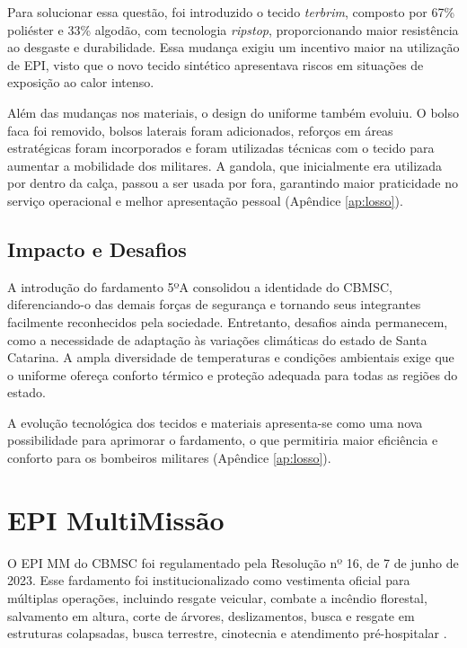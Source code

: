 Para solucionar essa questão, foi introduzido o tecido \textit{terbrim}, composto por 67\% poliéster
 e 33\% algodão, com tecnologia \textit{ripstop}, proporcionando maior resistência ao desgaste 
 e durabilidade. Essa mudança exigiu um incentivo maior na utilização de 
 \acrfull{EPI}, visto que o novo tecido sintético apresentava riscos em situações de exposição 
 ao calor intenso.

Além das mudanças nos materiais, o design do uniforme também evoluiu. O bolso faca foi removido, 
bolsos laterais foram adicionados, reforços em áreas estratégicas foram incorporados e foram utilizadas
técnicas com o tecido para aumentar a mobilidade dos militares. A gandola, que inicialmente 
era utilizada por dentro da calça, passou a ser usada por fora, garantindo maior praticidade no 
serviço operacional e melhor apresentação pessoal (Apêndice \ref{ap:losso}).

\subsection{Impacto e Desafios}

A introdução do fardamento 5ºA consolidou a identidade do \acrshort{CBMSC}, diferenciando-o das 
demais forças de segurança e tornando seus integrantes facilmente reconhecidos pela sociedade. 
Entretanto, desafios ainda permanecem, como a necessidade de adaptação às variações climáticas 
do estado de Santa Catarina. A ampla diversidade de temperaturas e condições ambientais exige 
que o uniforme ofereça conforto térmico e proteção adequada para todas as regiões do estado.

A evolução tecnológica dos tecidos e materiais apresenta-se como uma nova possibilidade
 para aprimorar o fardamento, o que permitiria maior eficiência e conforto para os bombeiros 
 militares (Apêndice \ref{ap:losso}). 


\section{EPI MultiMissão}

O \acrshort{EPI} \acrfull{MM} do \acrshort{CBMSC} foi regulamentado pela Resolução nº 16, de 7 de junho de 2023. Esse fardamento foi institucionalizado como vestimenta oficial para múltiplas operações, incluindo resgate veicular, combate a incêndio florestal, salvamento em altura, corte de árvores, deslizamentos, busca e resgate em estruturas colapsadas, busca terrestre, cinotecnia e atendimento pré-hospitalar \cite{res16}.

